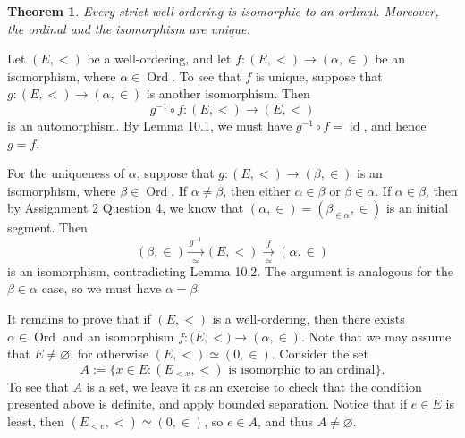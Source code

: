 \documentclass[10pt]{article}
\makeatletter
\DeclareMathOperator{\Ord}{Ord}
\DeclareMathOperator{\id}{id}
\theoremstyle{newstyle}
\newtheorem{thm}{Theorem}[section]
\newenvironment{pf}[1][\proofname]{\par
  \pushQED{\qed}%
  \normalfont \topsep0\p@\relax
  \trivlist
  \item[\hskip\labelsep\scshape
  #1\@addpunct{.}]\ignorespaces
}{%
  \popQED\endtrivlist\@endpefalse
}
\makeatother
\begin{document}
\begin{thm} 
Every strict well-ordering is isomorphic to an ordinal. Moreover, the ordinal and the 
isomorphism are unique.
\end{thm} 
\begin{pf}
Let $(E, <)$ be a well-ordering, and let $f : (E, <) \to (\alpha, \in)$ be an isomorphism, 
where $\alpha \in \Ord$. 
To see that $f$ is unique, suppose that $g : (E, <) \to (\alpha, \in)$ is another isomorphism. 
Then 
\[ g^{-1} \circ f : (E, <) \to (E, <) \] 
is an automorphism. By Lemma 10.1, we must have $g^{-1} \circ f = \id$, and hence $g = f$. 

For the uniqueness of $\alpha$, suppose that $g : (E, <) \to (\beta, \in)$ is an isomorphism, where 
$\beta \in \Ord$. If $\alpha \neq \beta$, then either $\alpha \in \beta$ or $\beta \in \alpha$. 
If $\alpha \in \beta$, then by Assignment 2 Question 4, we know that $(\alpha, \in) = (\beta_{\in\alpha}, \in)$ is an initial segment. Then 
\[ (\beta, \in) \xrightarrow[\simeq]{g^{-1}} (E, <) \xrightarrow[\simeq]{f} (\alpha, \in) \] 
is an isomorphism, contradicting Lemma 10.2. The argument is analogous for the $\beta \in \alpha$ case, 
so we must have $\alpha = \beta$. 

It remains to prove that if $(E, <)$ is a well-ordering, then there exists $\alpha \in \Ord$ 
and an isomorphism $f : (E, {<)} \to (\alpha, \in)$. Note that we may assume that 
$E \neq \varnothing$, for otherwise $(E, <) \simeq (0, \in)$. Consider the set 
\[ A := \{x \in E : (E_{<x}, <) \text{ is isomorphic to an ordinal}\}. \]
To see that $A$ is a set, we leave it as an exercise to check that the condition presented above 
is definite, and apply bounded separation. Notice that if $e \in E$ is least, then 
$(E_{<e}, <) \simeq (0, \in)$, so $e \in A$, and thus $A \neq \varnothing$. 


\end{pf}
\end{document}

